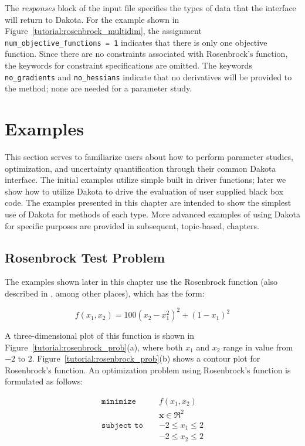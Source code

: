 The \emph{responses} block of the input file specifies the types of
data that the interface will return to Dakota. For the example shown
in Figure~\ref{tutorial:rosenbrock_multidim}, the assignment
\texttt{num\_objective\_functions = 1}
indicates that there is only one objective
function. Since there are no constraints
associated with Rosenbrock's function, the keywords for
constraint specifications are omitted. The keywords
\texttt{no\_gradients} and \texttt{no\_hessians} indicate that no
derivatives will be provided to the method; none are needed for
a parameter study.

\section{Examples}\label{tutorial:examples}

This section serves to familiarize users about how to perform parameter 
studies, optimization, and uncertainty quantification through their common
Dakota interface. The initial examples utilize simple built in driver 
functions; later we show how to utilize Dakota to drive the evaluation of 
user supplied black box code. The examples presented in this chapter 
are intended to show the simplest use of Dakota for methods of 
each type. More advanced examples of using Dakota for specific purposes 
are provided in subsequent, topic-based, chapters.

\subsection{Rosenbrock Test Problem}\label{tutorial:examples:rosenbrock}

The examples shown later in this chapter use the Rosenbrock
function \cite{Rosenbrock60} (also described in \cite{Gil81}, among
other places), which has the form:

\begin{equation}
f(x_1,x_2)=100(x_2-x_1^2)^2+(1-x_1)^2 \label{tutorial:rosen}
\end{equation}

A three-dimensional plot of this function is shown in
Figure~\ref{tutorial:rosenbrock_prob}(a), where both $x_1$ and
$x_2$ range in value from $-2$ to $2$.
Figure~\ref{tutorial:rosenbrock_prob}(b) shows a contour plot
for Rosenbrock's function. An optimization problem using Rosenbrock's
function is formulated as follows:

\begin{eqnarray}
\texttt{minimize }   & & f(x_1,x_2)          \nonumber\\
                     & & \mathbf{x} \in \Re^2\nonumber\\
\texttt{subject to } & & -2 \le x_1 \le 2    \\
                     & & -2 \le x_2 \le 2    \nonumber
\end{eqnarray}

